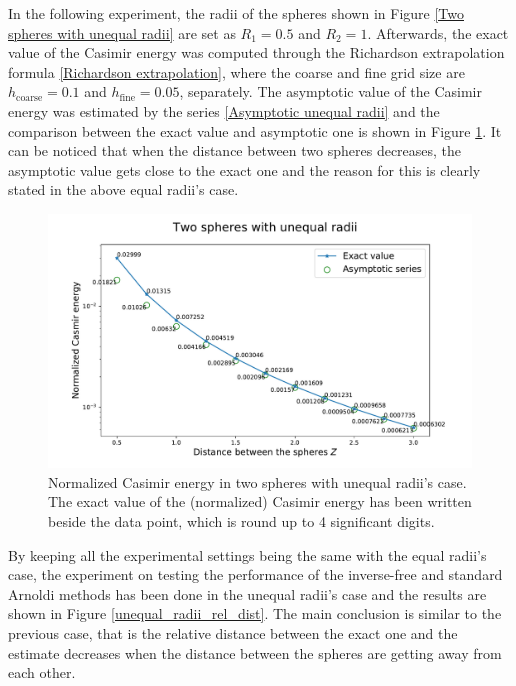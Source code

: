 In the following experiment, the radii of the spheres shown in Figure \ref{Two spheres with unequal radii} are set as $R_{1} = 0.5$ and $ R_{2} = 1$. 
Afterwards, the exact value of the Casimir energy was computed through the Richardson extrapolation formula \eqref{Richardson extrapolation}, 
where the coarse and fine grid size are $h_{\text{coarse}} = 0.1$ and $h_{\text{fine}} = 0.05$, separately. The asymptotic value of the Casimir energy was 
estimated by the series \eqref{Asymptotic unequal radii} and the comparison between the exact value and asymptotic one is shown in Figure 
\ref{Casimir energy between spheres with unequal radii}. It can be noticed that when the distance between two spheres decreases, the asymptotic value gets 
close to the exact one and the reason for this is clearly stated in the above equal radii's case.
\begin{figure}[H]
    \includegraphics[scale = 0.7]{figures/Spheres_unequal_CasE.pdf}
    \caption{Normalized Casimir energy in two spheres with unequal radii's case. The exact value of the (normalized) Casimir energy has been written 
    beside the data point, which is round up to 4 significant digits.}
    \label{Casimir energy between spheres with unequal radii}
\end{figure}

By keeping all the experimental settings being the same with the equal radii's case, the experiment on testing the performance of the inverse-free and 
standard Arnoldi methods has been done in the unequal radii's case and the results are shown in Figure \ref{unequal_radii_rel_dist}. 
The main conclusion is similar to the previous case, that is the relative distance between the exact one and the estimate decreases when the distance between 
the spheres are getting away from each other. 

